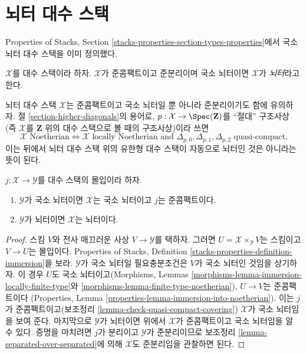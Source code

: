 \section{뇌터 대수 스택}
\label{section-noetherian}

\noindent
Properties of Stacks, Section
\ref{stacks-properties-section-types-properties}에서 국소 뇌터 대수 스택을
이미 정의했다.

\begin{definition}
\label{definition-noetherian}
$\mathcal{X}$를 대수 스택이라 하자. $\mathcal{X}$가 준콤팩트이고
준분리이며 국소 뇌터이면 $\mathcal{X}$가 {\it 뇌터}라고 한다.
\end{definition}

\noindent
뇌터 대수 스택 $\mathcal{X}$는 준콤팩트이고 국소 뇌터일 뿐 아니라
준분리이기도 함에 유의하자. 절 \ref{section-higher-diagonals}의 용어로,
$p : \mathcal{X} \to \Spec(\mathbf{Z})$를 ``절대'' 구조사상
(즉 $\mathcal{X}$를 $\mathbf{Z}$ 위의 대수 스택으로 볼 때의 구조사상)이라
쓰면
$$
\mathcal{X}\text{ Noetherian}
\Leftrightarrow
\mathcal{X}\text{ locally Noetherian and }
\Delta_{p, 0}, \Delta_{p, 1}, \Delta_{p, 2}
\text{ quasi-compact}.
$$
이는 뒤에서 뇌터 대수 스택 위의 유한형 대수 스택이 자동으로 뇌터인 것은
아니라는 뜻이 된다.

\begin{lemma}
\label{lemma-locally-closed-in-noetherian}
$j : \mathcal{X} \to \mathcal{Y}$를 대수 스택의 몰입이라 하자.
\begin{enumerate}
\item $\mathcal{Y}$가 국소 뇌터이면 $\mathcal{X}$는 국소 뇌터이고
$j$는 준콤팩트이다.
\item $\mathcal{Y}$가 뇌터이면 $\mathcal{X}$는 뇌터이다.
\end{enumerate}
\end{lemma}

\begin{proof}
스킴 $V$와 전사 매끄러운 사상 $V \to \mathcal{Y}$를 택하자.
그러면 $U = \mathcal{X} \times_\mathcal{Y} V$는 스킴이고
$V \to U$는 몰입이다. Properties of Stacks, Definition
\ref{stacks-properties-definition-immersion}을 보라.
$\mathcal{Y}$가 국소 뇌터일 필요충분조건은 $V$가 국소 뇌터인 것임을
상기하자. 이 경우 $U$도 국소 뇌터이고(Morphisms, Lemmas
\ref{morphisms-lemma-immersion-locally-finite-type}와
\ref{morphisms-lemma-finite-type-noetherian}), $U \to V$는 준콤팩트이다
(Properties, Lemma \ref{properties-lemma-immersion-into-noetherian}).
이는 $j$가 준콤팩트이고(보조정리
\ref{lemma-check-quasi-compact-covering}) $\mathcal{X}$가 국소 뇌터임을
보여 준다. 마지막으로 $\mathcal{Y}$가 뇌터이면 위에서
$\mathcal{X}$가 준콤팩트이고 국소 뇌터임을 알 수 있다.
증명을 마치려면 $j$가 분리이고 $\mathcal{Y}$가 준분리이므로 보조정리
\ref{lemma-separated-over-separated}에 의해 $\mathcal{X}$도 준분리임을
관찰하면 된다.
\end{proof}

